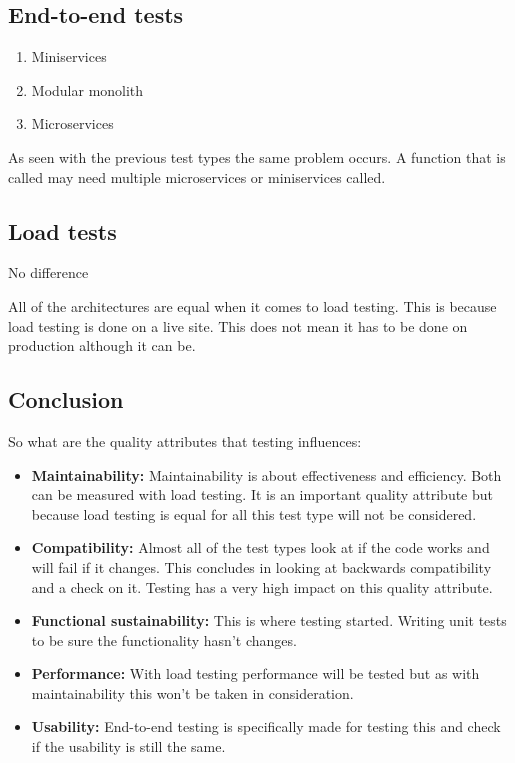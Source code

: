 \subsection{End-to-end tests}

\begin{enumerate}
        \item Miniservices
        \item Modular monolith
        \item Microservices
\end{enumerate}

As seen with the previous test types the same problem occurs. A function that is called may need multiple microservices or miniservices called.

\subsection{Load tests}

No difference

All of the architectures are equal when it comes to load testing. This is because load testing is done on a live site. This does not mean it has to be done on production although it can be.

\subsection{Conclusion}

So what are the quality attributes that testing influences:

\begin{itemize}
        \item \textbf{Maintainability:} Maintainability is about effectiveness and efficiency. Both can be measured with load testing. It is an important quality attribute but because load testing is equal for all this test type will not be considered.

        \item \textbf{Compatibility:} Almost all of the test types look at if the code works and will fail if it changes. This concludes in looking at backwards compatibility and a check on it. Testing has a very high impact on this quality attribute.

        \item \textbf{Functional sustainability:} This is where testing started. Writing unit tests to be sure the functionality hasn’t changes.

        \item \textbf{Performance:} With load testing performance will be tested but as with maintainability this won’t be taken in consideration.

        \item \textbf{Usability:} End-to-end testing is specifically made for testing this and check if the usability is still the same.
\end{itemize}

